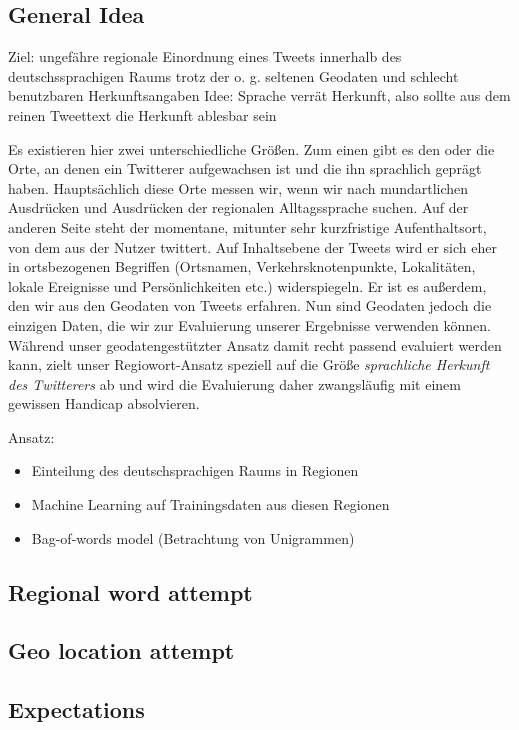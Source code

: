 \documentclass[../Main.tex]{subfiles}
\begin{document}
\subsection{General Idea}
Ziel: ungefähre regionale Einordnung eines Tweets innerhalb des deutschssprachigen Raums trotz der o. g. seltenen Geodaten und schlecht benutzbaren Herkunftsangaben %
Idee: Sprache verrät Herkunft, also sollte aus dem reinen Tweettext die Herkunft ablesbar sein %

Es existieren hier zwei unterschiedliche Größen. Zum einen gibt es den oder die Orte, an denen ein Twitterer aufgewachsen ist und die ihn sprachlich geprägt haben. Hauptsächlich diese Orte messen wir, wenn wir nach mundartlichen Ausdrücken und Ausdrücken der regionalen Alltagssprache suchen. Auf der anderen Seite steht der momentane, mitunter sehr kurzfristige Aufenthaltsort, von dem aus der Nutzer twittert. Auf Inhaltsebene der Tweets wird er sich eher in ortsbezogenen Begriffen (Ortsnamen, Verkehrsknotenpunkte, Lokalitäten, lokale Ereignisse und Persönlichkeiten etc.) widerspiegeln. Er ist es außerdem, den wir aus den Geodaten von Tweets erfahren. Nun sind Geodaten jedoch die einzigen Daten, die wir zur Evaluierung unserer Ergebnisse verwenden können. Während unser geodatengestützter Ansatz damit recht passend evaluiert werden kann, zielt unser Regiowort-Ansatz speziell auf die Größe \textit{sprachliche Herkunft des Twitterers} ab und wird die Evaluierung daher zwangsläufig mit einem gewissen Handicap absolvieren.

Ansatz:
\begin{itemize}
\item Einteilung des deutschsprachigen Raums in Regionen
\item Machine Learning auf Trainingsdaten aus diesen Regionen
\item Bag-of-words model (Betrachtung von Unigrammen)
\end{itemize}

\subsection{Regional word attempt}
\subsection{Geo location attempt}
\subsection{Expectations}
\end{document}
